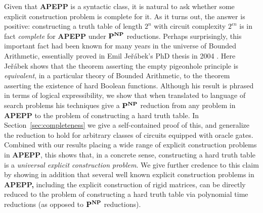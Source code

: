 \documentclass[11pt]{article}
\def\cl{\bf}
\begin{document}
Given that {\cl APEPP} is a syntactic class, it is natural to ask whether some explicit construction problem is complete for it. As it turns out, the answer is positive: constructing a truth table of length $2^n$ with circuit complexity $2^{\epsilon n}$ is in fact \emph{complete} for {\cl APEPP} under ${\cl P}^{\cl NP}$ reductions. Perhaps surprisingly, this important fact had been known for many years in the universe of Bounded Arithmetic, essentially proved in Emil Je\v{r}\'{a}bek's PhD thesis in 2004 \cite{Jerabek}. Here Je\v{r}\'{a}bek shows that the theorem asserting the empty pigeonhole principle is \emph{equivalent}, in a particular theory of Bounded Arithmetic, to the theorem asserting the existence of hard Boolean functions. Although his result is phrased in terms of logical expressibility, we show that when translated to language of search problems his techniques give a ${\cl P}^{\cl NP}$ reduction from any problem in {\cl APEPP} to the problem of constructing a hard truth table. In Section~\ref{sec:completeness} we give a self-contained proof of this, and generalize the reduction to hold for arbitrary classes of circuits equipped with oracle gates. Combined with our results placing a wide range of explicit construction problems in {\cl APEPP}, this shows that, in a concrete sense, constructing a hard truth table is a \emph{universal explicit construction problem}. We give further credence to this claim by showing in addition that several well known explicit construction problems in {\cl APEPP,} including the explicit construction of rigid matrices, can be directly reduced to the problem of constructing a hard truth table via polynomial time reductions (as opposed to ${\cl P}^{\cl NP}$ reductions).
\end{document}
